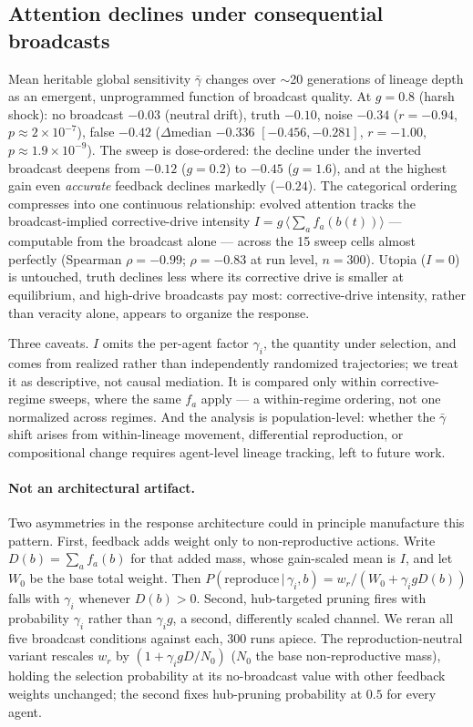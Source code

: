 \documentclass{svproc}
\begin{document}
\subsection{Attention declines under consequential broadcasts}
Mean heritable global sensitivity $\bar\gamma$ changes over $\sim$20
generations of lineage depth as an emergent, unprogrammed function of
broadcast quality. At $g=0.8$ (harsh shock): no
broadcast $-0.03$ (neutral drift), truth $-0.10$, noise $-0.34$ ($r=-0.94$,
$p\!\approx\!2\times10^{-7}$), false $-0.42$ ($\Delta$median $-0.336$
$[-0.456,-0.281]$, $r=-1.00$, $p\!\approx\!1.9\times10^{-9}$). The sweep is
dose-ordered: the decline under the inverted broadcast deepens from $-0.12$
($g=0.2$) to $-0.45$ ($g=1.6$), and at the highest gain even \emph{accurate}
feedback declines markedly ($-0.24$). The categorical ordering compresses into one
continuous relationship: evolved attention tracks the broadcast-implied
corrective-drive intensity $I = g\,\langle\textstyle\sum_a f_a(b(t))\rangle$
--- computable from the broadcast alone --- across the 15 sweep cells almost
perfectly (Spearman $\rho=-0.99$; $\rho=-0.83$ at run level, $n=300$). Utopia ($I=0$) is untouched, truth declines less where its corrective drive is
smaller at equilibrium, and high-drive broadcasts pay most: corrective-drive
intensity, rather than veracity alone, appears to organize the response.

Three caveats. $I$ omits the per-agent factor $\gamma_i$, the quantity under
selection, and comes from realized rather than independently randomized
trajectories; we treat it as descriptive, not causal mediation. It is
compared only within corrective-regime sweeps, where the same $f_a$ apply ---
a within-regime ordering, not one normalized across regimes. And the analysis is
population-level: whether the $\bar\gamma$ shift arises from within-lineage
movement, differential reproduction, or compositional change requires
agent-level lineage tracking, left to future work.

\paragraph{Not an architectural artifact.} Two asymmetries in the response
architecture could in principle manufacture this pattern. First, feedback
adds weight only to non-reproductive actions. Write $D(b)=\sum_a f_a(b)$ for
that added mass, whose gain-scaled mean is $I$, and let $W_0$ be the base
total weight. Then
$P(\text{reproduce}\,|\,\gamma_i,b)=w_r/(W_0+\gamma_i g D(b))$ falls with
$\gamma_i$ whenever $D(b)>0$.
Second, hub-targeted pruning fires with probability $\gamma_i$ rather than
$\gamma_i g$, a second, differently scaled channel. We reran all five
broadcast conditions against each, 300 runs apiece. The reproduction-neutral
variant rescales $w_r$ by $(1+\gamma_i g D/N_0)$ ($N_0$ the base
non-reproductive mass), holding the selection probability at its no-broadcast
value with other feedback weights unchanged; the second fixes hub-pruning
probability at $0.5$ for every agent.
\end{document}
